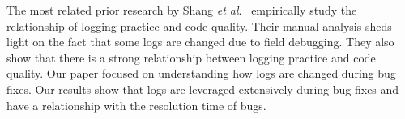 The most related prior research by Shang \emph{et al$.$}~\cite{EMSEIAN} empirically study the relationship of logging practice and code quality. Their manual analysis sheds light on the fact that some logs are changed due to field debugging. They also show that there is a strong relationship between logging practice and code quality. Our paper focused on understanding how logs are changed during bug fixes. Our results show that logs are leveraged extensively during bug fixes and have a relationship with the resolution time of bugs. 

